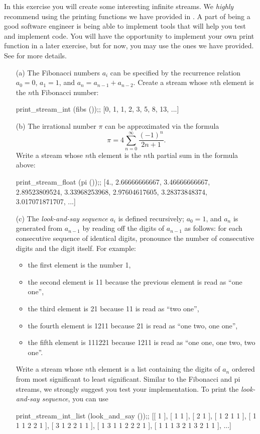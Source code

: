 \documentclass{pset}
\begin{document}

In this exercise you will create some interesting infinite
streams. We \emph{highly} recommend using the printing functions we have
provided in . A part of being a good software engineer
is being able to implement tools that will help you test and implement code.
You will have the opportunity to implement your own print function in a later
exercise, but for now, you may use the ones we have provided. See
 for more details.

\begin{itemize}
\item[(a)] The Fibonacci numbers $a_i$ can be specified by the recurrence
  relation $a_0 = 0$, $a_1 = 1$, and $a_n = a_{n-1} +
  a_{n-2}$. Create a stream  whose $n$th
  element is the $n$th Fibonacci number:
  \begin{ocaml}
  print_stream_int (fibs ());;
  [0, 1, 1, 2, 3, 5, 8, 13, ...]
  \end{ocaml}
\item[(b)] The irrational number $\pi$ can be approximated via the formula
  \[
  \pi = 4 \sum_{n=0}^\infty \frac{(-1)^{n}}{2n+1}.
  \]
  Write a stream  whose $n$th element is the
  $n$th partial sum in the formula above:
  \begin{ocaml}
  print_stream_float (pi ());;
  [4., 2.66666666667, 3.46666666667, 2.89523809524,
  3.33968253968, 2.97604617605, 3.28373848374,
  3.017071871707, ...]
  \end{ocaml}
\item[(c)] The \emph{look-and-say sequence} $a_i$ is defined recursively;
  $a_0 = 1$, and $a_n$ is generated from $a_{n-1}$ by reading
  off the digits of $a_{n-1}$ as follows: for each consecutive
  sequence of identical digits, pronounce the number of consecutive
  digits and the digit itself. For example:
  \begin{itemize}
  \item the first element is the number 1,
  \item the second element is 11 because the previous element is read
    as ``one one'',
  \item the third element is 21 because 11 is read as ``two one'',
  \item the fourth element is 1211 because 21 is read as ``one two, one one'',
  \item the fifth element is 111221 because 1211 is read as ``one one,
    one two, two one''.
  \end{itemize}
  Write a stream  whose $n$th
  element is a list containing the digits of $a_n$ ordered from most
  significant to least significant. Similar to the Fibonacci and pi streams,
  we strongly suggest you test your implementation. To print the
  \emph{look-and-say sequence}, you can use
  \begin{ocaml}
  print_stream_int_list (look_and_say ());;
  [[ 1 ], [ 1 1 ], [ 2 1 ], [ 1 2 1 1 ], [ 1 1 1 2 2 1 ],
  [ 3 1 2 2 1 1 ], [ 1 3 1 1 2 2 2 1 ],
  [ 1 1 1 3 2 1 3 2 1 1 ], ...]
  \end{ocaml}
\end{itemize}
\end{document}
